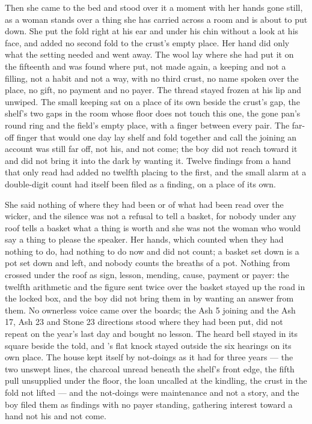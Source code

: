 Then she came to the bed and stood over it a moment with her hands gone still, as a woman stands over a thing she has carried across a room and is about to put down. She put the fold right at his ear and under his chin without a look at his face, and added no second fold to the crust's empty place. Her hand did only what the setting needed and went away. The wool lay where she had put it on the fifteenth and was found where put, not made again, a keeping and not a filling, not a habit and not a way, with no third crust, no name spoken over the place, no gift, no payment and no payer. The thread stayed frozen at his lip and unwiped. The small keeping sat on a place of its own beside the crust's gap, the shelf's two gaps in the room whose floor does not touch this one, the gone pan's round ring and the field's empty place, with a finger between every pair. The far-off finger that would one day lay shelf and fold together and call the joining an account was still far off, not his, and not come; the boy did not reach toward it and did not bring it into the dark by wanting it. Twelve findings from a hand that only read had added no twelfth placing to the first, and the small alarm at a double-digit count had itself been filed as a finding, on a place of its own.

She said nothing of where they had been or of what had been read over the wicker, and the silence was not a refusal to tell a basket, for nobody under any roof tells a basket what a thing is worth and she was not the woman who would say a thing to please the speaker. Her hands, which counted when they had nothing to do, had nothing to do now and did not count; a basket set down is a pot set down and left, and nobody counts the breaths of a pot. Nothing from  crossed under the roof as sign, lesson, mending, cause, payment or payer: the twelfth arithmetic and the figure sent twice over the basket stayed up the road in the locked box, and the boy did not bring them in by wanting an answer from them. No ownerless voice came over the boards; the Ash 5 joining and the Ash 17, Ash 23 and Stone 23 directions stood where they had been put, did not repeat on the year's last day and bought no lesson. The heard bell stayed in its square beside the told, and 's flat knock stayed outside the six hearings on its own place. The house kept itself by not-doings as it had for three years --- the two unswept lines, the charcoal unread beneath the shelf's front edge, the fifth pull unsupplied under the floor, the loan uncalled at the kindling, the crust in the fold not lifted --- and the not-doings were maintenance and not a story, and the boy filed them as findings with no payer standing, gathering interest toward a hand not his and not come.

